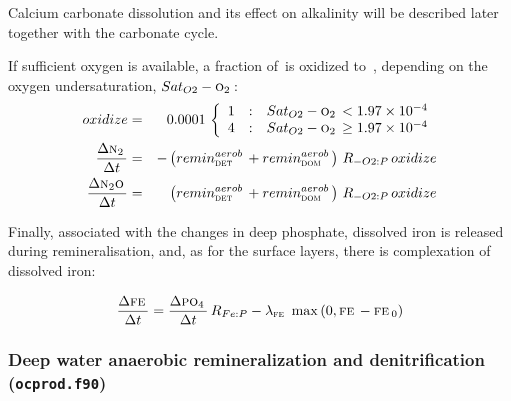 \documentclass[11pt,a4paper,fleqn,twoside]{article}
\def\pho{\text{\textsc{po$_4$}}\,}
\def\ntwo{\text{\textsc{n$_2$}}\,}
\def\ntwoo{\text{\textsc{n$_2$o}}\,}
\def\oxy{\text{\textsc{o$_2$}}\,}
\def\dom{\text{\textsc{dom}}\,}
\def\det{\text{\textsc{det}}\,}
\def\fe{\text{\textsc{fe}}\,}
\begin{document}
Calcium carbonate dissolution and its effect on alkalinity will be described
later together with the carbonate cycle.

If sufficient oxygen is available, a fraction of \ntwo is oxidized to
\ntwoo, depending on the oxygen undersaturation, $Sat_{O2} - \oxy$:
\begin{eqnarray}
oxidize & = & 0.0001 \, 
\left\{ \begin{array}{r@{\quad:\quad}l} 
1 & Sat_{O2} - \oxy < 1.97 \times 10^{-4}\\ 
4 & Sat_{O2} - \oxy \ge 1.97 \times 10^{-4}  
\end{array} \right. \nonumber \\
\frac{\Delta \ntwo}{\Delta  t} & = &  - 
\left(remin^{aerob}_\det+remin^{aerob}_\dom\right)\,R_{-O2:P}\,oxidize\\
\frac{\Delta \ntwoo}{\Delta  t} & = &  
\left(remin^{aerob}_\det+remin^{aerob}_\dom\right)\,R_{-O2:P}\,oxidize
\end{eqnarray}

Finally,  associated with the changes in deep phosphate, dissolved iron
is released during remineralisation, and, as for the surface layers, there is
complexation of dissolved iron:

\begin{equation}
\frac{\Delta  \fe}{\Delta  t} = \frac{\Delta  \pho}{\Delta  t}\, R_{Fe:P} - \lambda_\fe \, \max \left(0,\fe-\fe_0 \right)
\end{equation}



\clearpage

\subsubsection{\label{deep_anaerobic_remineralization}Deep water anaerobic
remineralization and denitrification  ({\tt ocprod.f90})} 
\end{document}
